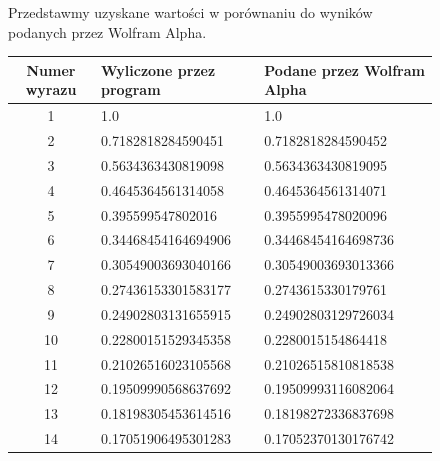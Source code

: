 \documentclass[11pt,wide]{article}
\begin{document}

\begin{figure}[h!]
Przedstawmy uzyskane wartości w porównaniu do wyników podanych przez Wolfram Alpha.
\begin{center}
  \begin{tabular}{ | c | l | l | }
  \hline
  Numer wyrazu & Wyliczone przez program & Podane przez Wolfram Alpha \\ \hline
  	1 & {\color{green}1.0} & {\color{green}1.0}\\
	2 & {\color{green}0.718281828459045}1 & {\color{green}0.718281828459045}2 \\ 
	3 & {\color{green}0.563436343081909}8 & {\color{green}0.563436343081909}5 \\ 
	4 & {\color{green}0.46453645613140}58 & {\color{green}0.46453645613140}71\\ 
	5 & {\color{green}0.3955995478020}16 & {\color{green}0.3955995478020}096\\ 
	6 & {\color{green}0.3446845416469}4906 & {\color{green}0.3446845416469}8736\\ 
	7 & {\color{green}0.305490036930}40166 & {\color{green}0.305490036930}13366\\ 
	8 & {\color{green}0.27436153301}583177 & {\color{green}0.27436153301}79761\\ 
	9 & {\color{green}0.249028031}31655915 & {\color{green}0.249028031}29726034\\ 
	10 & {\color{green}0.228001515}29345358 & {\color{green}0.228001515}4864418\\ 
	11 & {\color{green}0.2102651}6023105568 & {\color{green}0.2102651}5810818538\\ 
	12 & {\color{green}0.1950999}0568637692 & {\color{green}0.1950999}3116082064\\ 
	13 & {\color{green}0.18198}305453614516 & {\color{green}0.18198}272336837698\\ 
	14 & {\color{green}0.1705}1906495301283 & {\color{green}0.1705}2370130176742\\ 

\end{tabular}
\end{center}
\end{figure}
\end{document}
